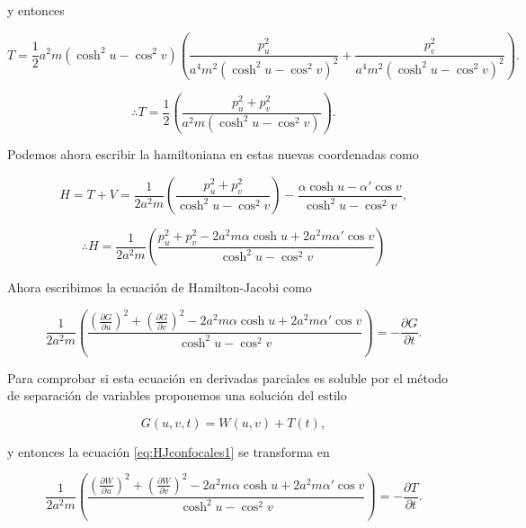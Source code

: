 \documentclass[a4paper,10pt]{article}
\numberwithin{equation}{section}
\begin{document}
y entonces 

\begin{equation}
 T = \frac{1}{2}a^2m(\cosh^2{u} - \cos^2{v})\left( \frac{p_u^2}{a^4m^2(\cosh^2{u} - \cos^2{v})^2} 
 + \frac{p_v^2}{a^4m^2(\cosh^2{u} - \cos^2{v})^2}\right).
\end{equation}

\begin{equation}
 \therefore T = \frac{1}{2}\left( \frac{p_u^2 + p_v^2}{a^2m(\cosh^2{u} - \cos^2{v})}\right).
\end{equation}


Podemos ahora escribir la hamiltoniana en estas nuevas coordenadas como 

\begin{equation}
 H = T + V = \frac{1}{2a^2m}\left( \frac{p_u^2 + p_v^2}{\cosh^2{u} - \cos^2{v}}\right) - \frac{\alpha \cosh{u} - \alpha'\cos{v}}{\cosh^2{u}- \cos^2{v}},
\end{equation}

\begin{equation}
 \therefore H = \frac{1}{2a^2m}\left( \frac{p_u^2 + p_v^2 - 2a^2m\alpha \cosh{u} + 2a^2m\alpha'\cos{v}}{\cosh^2{u}- \cos^2{v}}\right)
\end{equation}

Ahora escribimos la ecuación de Hamilton-Jacobi como

\begin{equation}
\frac{1}{2a^2m}\left( \frac{\left(\frac{\partial G}{\partial u} \right)^2 + 
\left(\frac{\partial G}{\partial v} \right)^2- 2a^2m\alpha \cosh{u} + 
2a^2m\alpha'\cos{v}}{\cosh^2{u}- \cos^2{v}}\right) = - \frac{\partial G}{\partial t}.
\label{eq:HJconfocales1}
\end{equation}

Para comprobar si esta ecuación en derivadas parciales es soluble por el método de 
separación de variables proponemos una solución del estilo 

\begin{equation}
 G(u,v,t) = W(u,v) + T(t),
\end{equation}

y entonces la ecuación \eqref{eq:HJconfocales1} se transforma en 

 \begin{equation}
\frac{1}{2a^2m}\left( \frac{\left(\frac{\partial W}{\partial u} \right)^2 + 
\left(\frac{\partial W}{\partial v} \right)^2- 2a^2m\alpha \cosh{u} + 
2a^2m\alpha'\cos{v}}{\cosh^2{u}- \cos^2{v}}\right) = - \frac{\partial T}{\partial t}.
\label{eq:HJconfocales2}
\end{equation}
\end{document}
